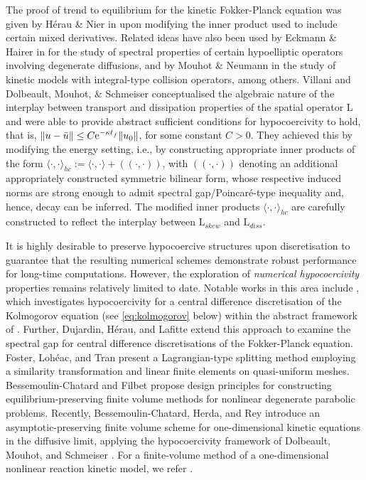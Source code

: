 \documentclass{amsart}
\theoremstyle{definition}
\theoremstyle{remark}
\numberwithin{equation}{section}
\begin{document}
 The proof of trend to equilibrium for the kinetic Fokker-Planck equation was given by H\'erau \& Nier in \cite{herau_nier} upon modifying the inner product used to include certain mixed derivatives. Related ideas have also been used by Eckmann \& Hairer in \cite{jeckmann_hairer} for the study of spectral properties of certain hypoelliptic operators involving degenerate diffusions, and by Mouhot \& Neumann \cite{mouhot_neumann} in the study of kinetic models with integral-type collision operators, among others.  Villani \cite{villani} and Dolbeault, Mouhot, \& Schmeiser \cite{DMS_TAMS} conceptualised the algebraic nature of the interplay between transport and dissipation properties of the spatial operator $\mathrm{L}$ and were able to provide abstract sufficient conditions for hypocoercivity to hold, that is,	$
 \|u-\bar{u}\|\le C{\rm e}^{-\kappa t_f^{}}\|u_0\|
 $,
 for some constant $C>0$. They achieved this by modifying the energy setting, i.e., by constructing appropriate inner products of the form $\langle \cdot,\cdot \rangle_{hc}:=\langle \cdot,\cdot \rangle + (\!( \cdot,\cdot )\!)$,  {with $(\!( \cdot,\cdot )\!)$ denoting an additional appropriately constructed symmetric bilinear form,} whose respective induced norms are strong enough to admit spectral gap/Poincar\'e-type inequality and, hence, decay can be inferred. The modified inner products $\langle \cdot,\cdot \rangle_{hc}$ are carefully constructed to reflect the interplay between  $\mathrm{L}_{skew}$ and $\mathrm{L}_{diss}$.

 {It is highly desirable to preserve hypocoercive structures upon discretisation} to guarantee that the resulting numerical schemes   {demonstrate} robust performance for long-time computations. However, the exploration of \emph{numerical hypocoercivity} properties remains relatively limited to date. Notable works in this area include \cite{porretta_zuazua}, which investigates hypocoercivity for a central difference discretisation of the Kolmogorov equation (see \eqref{eq:kolmogorov} below) within the abstract framework of \cite[Theorem 18]{villani}. Further, Dujardin, H\'erau, and Lafitte \cite{dujardin_herau_lafitte} extend this approach to examine the spectral gap for central difference discretisations of the Fokker-Planck equation. Foster, Loh\'eac, and Tran \cite{foster_loheac_tran} present a Lagrangian-type splitting method employing  a similarity transformation and linear finite elements on quasi-uniform meshes.  Bessemoulin-Chatard and Filbet \cite{besse_filbet} propose design principles for constructing equilibrium-preserving finite volume methods for nonlinear degenerate parabolic problems. Recently, Bessemoulin-Chatard, Herda, and Rey \cite{besse_FV} introduce an asymptotic-preserving finite volume scheme for one-dimensional kinetic equations in the diffusive limit, applying the hypocoercivity framework of Dolbeault, Mouhot, and Schmeiser \cite{DMS_TAMS}. For a finite-volume method of a one-dimensional nonlinear reaction kinetic model, we refer \cite{bessemoulin2024discrete}.
\end{document}
